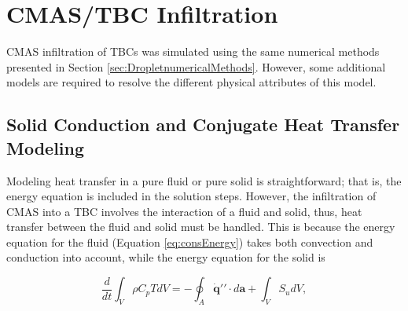 \documentclass{UCF_ETD}
\begin{document}






\section{CMAS/TBC Infiltration}
\label{sec:CMAS_methods}

CMAS infiltration of TBCs was simulated using the same numerical methods presented in Section \ref{sec:DropletnumericalMethods}. However, some additional models are required to resolve the different physical attributes of this model. 

\subsection{Solid Conduction and Conjugate Heat Transfer Modeling}

Modeling heat transfer in a pure fluid or pure solid is straightforward; that is, the energy equation is included in the solution steps. However, the infiltration of CMAS into a TBC involves the interaction of a fluid and solid, thus, heat transfer between the fluid and solid must be handled. This is because the energy equation for the fluid (Equation \ref{eq:consEnergy}) takes both convection and conduction into account, while the energy equation for the solid is 

\begin{equation}
    \frac{d}{d t} \int_V \rho C_p T d V=-\oint_A \dot{\mathbf{q}} \prime \prime \cdot d \mathbf{a}+\int_V S_u d V,
    \label{eq:solidEnergy}
\end{equation}
\end{document}

